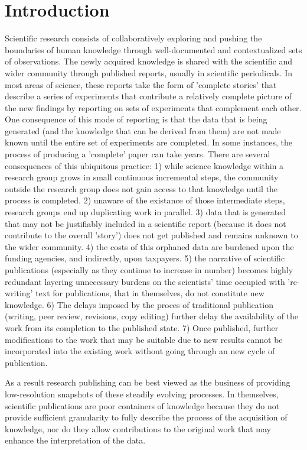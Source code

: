 \documentclass[final,authoryear,3p]{elsarticle-open-drafting}
\begin{document}
\section{Introduction}
Scientific research consists of collaboratively exploring and pushing the boundaries of human knowledge through well-documented and contextualized sets of observations. The newly acquired knowledge is shared with the scientific and wider community through published reports, usually in scientific periodicals. In most areas of science, these reports take the form of 'complete stories' that describe a series of experiments that contribute a relatively complete picture of the new findings by reporting on sets of experiments that complement each other. One consequence of this mode of reporting is that the data that is being generated (and the knowledge that can be derived from them) are not made known until the entire set of experiments are completed. In some instances, the process of producing a 'complete' paper can take years.
There are several consequences of this ubiquitous practice:
1) while science knowledge within a research group grows in small continuous incremental steps, the community outside the research group does not gain access to that knowledge until the process is completed. 
2) unaware of the existance of those intermediate steps, research groups end up duplicating work in parallel. 
3) data that is generated that may not be justifiably included in a scientific report (because it does not contribute to the overall 'story') does not get published and remains unknown to the wider community. 
4) the costs of this orphaned data are burdened upon the funding agencies, and indirectly, upon taxpayers. 
5) the narrative of scientific publications (especially as they continue to increase in number) becomes highly redundant layering unnecessary burdens on the scientists' time occupied with 're-writing' text for publications, that in themselves, do not constitute new knowledge. 
6) The delays imposed by the proces of traditional publication (writing, peer review, revisions, copy editing) further delay the availability of the work from its completion to the published state. 
7) Once published, further modifications to the work that may be suitable due to new results cannot be incorporated into the existing work without going through an new cycle of publication. 

As a result research publishing can be best viewed as the business of providing low-resolution snapshots of these
steadily evolving processes. In themselves, scientific publications are poor containers of knowledge because they do not provide sufficient granularity to fully describe the process of the acquisition of knowledge, nor do they allow contributions to the original work that may enhance the interpretation of the data. 
\end{document}
